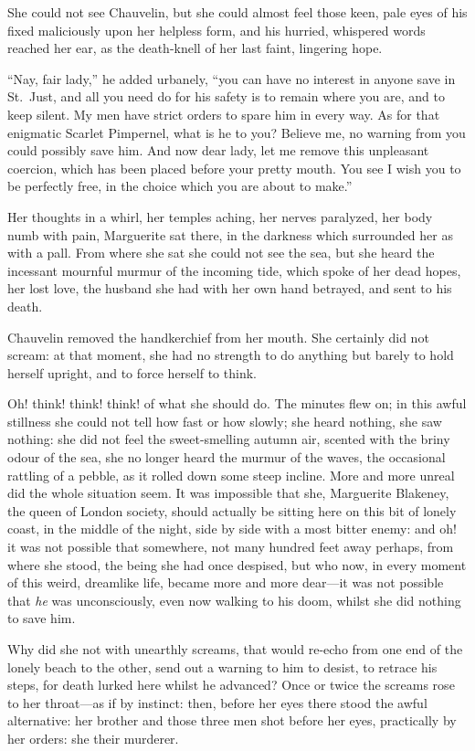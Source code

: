 \documentclass[paper=5.5in:8.5in,BCOR=7mm,twoside,DIV=calc,12pt,usegeometry,chapterprefix,endperiod,headings=big]{scrbook}
\begin{document}
She could not see Chauvelin, but she could almost feel those keen, pale eyes of his fixed maliciously upon her helpless form, and his hurried, whispered words reached her ear, as the death-knell of her last faint, lingering hope.

\enquote{Nay, fair lady,} he added urbanely, \enquote{you can have no interest in anyone save in St.~Just, and all you need do for his safety is to remain where you are, and to keep silent. My men have strict orders to spare him in every way. As for that enigmatic Scarlet Pimpernel, what is he to you? Believe me, no warning from you could possibly save him. And now dear lady, let me remove this unpleasant coercion, which has been placed before your pretty mouth. You see I wish you to be perfectly free, in the choice which you are about to make.}

Her thoughts in a whirl, her temples aching, her nerves paralyzed, her body numb with pain, Marguerite sat there, in the darkness which surrounded her as with a pall. From where she sat she could not see the sea, but she heard the incessant mournful murmur of the incoming tide, which spoke of her dead hopes, her lost love, the husband she had with her own hand betrayed, and sent to his death.

Chauvelin removed the handkerchief from her mouth. She certainly did not scream: at that moment, she had no strength to do anything but barely to hold herself upright, and to force herself to think.

Oh! think! think! think! of what she should do. The minutes flew on; in this awful stillness she could not tell how fast or how slowly; she heard nothing, she saw nothing: she did not feel the sweet-smelling autumn air, scented with the briny odour of the sea, she no longer heard the murmur of the waves, the occasional rattling of a pebble, as it rolled down some steep incline. More and more unreal did the whole situation seem. It was impossible that she, Marguerite Blakeney, the queen of London society, should actually be sitting here on this bit of lonely coast, in the middle of the night, side by side with a most bitter enemy: and oh! it was not possible that somewhere, not many hundred feet away perhaps, from where she stood, the being she had once despised, but who now, in every moment of this weird, dreamlike life, became more and more dear---it was not possible that \textit{he} was unconsciously, even now walking to his doom, whilst she did nothing to save him.

Why did she not with unearthly screams, that would re-echo from one end of the lonely beach to the other, send out a warning to him to desist, to retrace his steps, for death lurked here whilst he advanced? Once or twice the screams rose to her throat---as if by instinct: then, before her eyes there stood the awful alternative: her brother and those three men shot before her eyes, practically by her orders: she their murderer.
\end{document}

